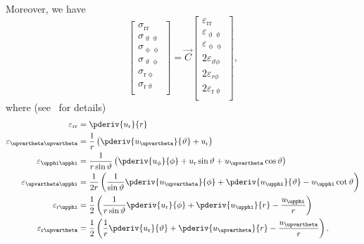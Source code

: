 Moreover, we have
\begin{equation}
\label{Eq2:constitutiveRelationSpherical}
	\begin{bmatrix}
		\sigma_{\mathrm{rr}}\\
		\sigma_{\upvartheta\upvartheta}\\
		\sigma_{\upphi\upphi}\\
		\sigma_{\upvartheta \upphi}\\
		\sigma_{\mathrm{r} \upphi}\\
		\sigma_{\mathrm{r}\upvartheta}\\
	\end{bmatrix} = \vec{C}
	\begin{bmatrix}
		\varepsilon_{\mathrm{rr}}\\
		\varepsilon_{\upvartheta\upvartheta}\\
		\varepsilon_{\upphi\upphi}\\
		2\varepsilon_{\vartheta \phi}\\
		2\varepsilon_{r \phi}\\
		2\varepsilon_{\mathrm{r}\upvartheta}\\
	\end{bmatrix},
\end{equation}
where (see~\cite{Slaughter2002tlt} for details)
\begin{equation}
\label{Eq2:strainsInSpherical}
\begin{split}
	\varepsilon_{\mathrm{rr}} &= \pderiv{u_{\mathrm{r}}}{r}\\
	\varepsilon_{\upvartheta\upvartheta} &= \frac{1}{r}\left(\pderiv{u_{\upvartheta}}{\vartheta} + u_{\mathrm{r}}\right)\\
	\varepsilon_{\upphi\upphi} &= \frac{1}{r\sin\vartheta}\left(\pderiv{u_{\phi}}{\phi} + u_{\mathrm{r}}\sin\vartheta + u_{\upvartheta}\cos\vartheta\right)\\
	\varepsilon_{\upvartheta\upphi} &= \frac{1}{2r}\left(\frac{1}{\sin\vartheta}\pderiv{u_{\upvartheta}}{\phi} + \pderiv{u_{\upphi}}{\vartheta} - u_{\upphi}\cot\vartheta\right)\\
	\varepsilon_{\mathrm{r}\upphi} &= \frac{1}{2}\left(\frac{1}{r\sin\vartheta}\pderiv{u_{\mathrm{r}}}{\phi} + \pderiv{u_{\upphi}}{r} - \frac{u_{\upphi}}{r}\right)\\
	\varepsilon_{\mathrm{r}\upvartheta} &= \frac{1}{2}\left(\frac{1}{r}\pderiv{u_{\mathrm{r}}}{\vartheta} + \pderiv{u_{\upvartheta}}{r} - \frac{u_{\upvartheta}}{r}\right).
\end{split}
\end{equation}

